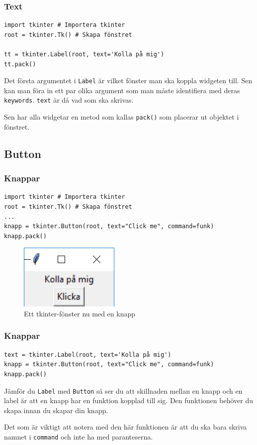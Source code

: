 \documentclass[aspectratio=169]{beamer}
\begin{document}
\begin{frame}[fragile]
\frametitle{Text}

\begin{lstlisting}
import tkinter # Importera tkinter
root = tkinter.Tk() # Skapa fönstret

tt = tkinter.Label(root, text='Kolla på mig')
tt.pack() 
\end{lstlisting}

Det första argumentet i \texttt{Label} är vilket fönster man ska koppla widgeten till. Sen kan man föra in ett par olika argument som man måste identifiera med deras \texttt{keywords}. \texttt{text} är då vad som ska skrivas.

Sen har alla widgetar en metod som kallas \texttt{pack()} som placerar ut objektet i fönstret.

\end{frame}

\subsection{Button}

\begin{frame}[fragile]
\frametitle{Knappar}

\begin{lstlisting}
import tkinter # Importera tkinter
root = tkinter.Tk() # Skapa fönstret
...
knapp = tkinter.Button(root, text="Click me", command=funk)
knapp.pack()
\end{lstlisting}

\begin{figure}
\begin{center}
\includegraphics[]{win3.png}
\caption{Ett tkinter-fönster nu med en knapp}
\end{center}
\end{figure}

\end{frame}

\begin{frame}[fragile]
\frametitle{Knappar}

\begin{lstlisting}
text = tkinter.Label(root, text='Kolla på mig')
knapp = tkinter.Button(root, text="Click me", command=funk)
knapp.pack()
\end{lstlisting}

Jämför du \texttt{Label} med \texttt{Button} så ser du att skillnaden mellan en knapp och en label är att en knapp har en funktion kopplad till sig. Den funktionen behöver du skapa innan du skapar din knapp.

Det som är viktigt att notera med den här funktionen är att du ska bara skriva namnet i \texttt{command} och inte ha med paranteserna.

\end{frame}
\end{document}
